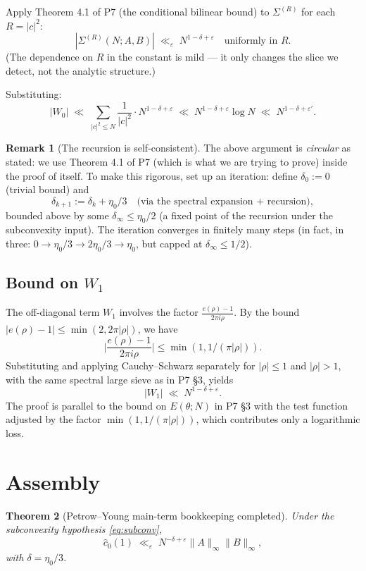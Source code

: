 \documentclass[11pt]{article}
\newtheorem{theorem}{Theorem}[section]
\theoremstyle{definition}
\newtheorem{remark}[theorem]{Remark}
\begin{document}
Apply Theorem 4.1 of P7 (the conditional bilinear bound) to $\Sigma^{(R)}$ for each $R=|c|^2$:
\[
|\Sigma^{(R)}(N;A,B)|\;\ll_\varepsilon\;N^{1-\delta+\varepsilon}\quad\text{uniformly in }R.
\]
(The dependence on $R$ in the constant is mild — it only changes the slice we detect, not the analytic structure.)

Substituting:
\[
|W_0|\;\ll\;\sum_{|c|^2\le N}\frac{1}{|c|^2}\cdot N^{1-\delta+\varepsilon}\;\ll\;N^{1-\delta+\varepsilon}\log N\;\ll\;N^{1-\delta+\varepsilon'}.
\]

\begin{remark}[The recursion is self-consistent]\label{rem:recursion}
The above argument is \emph{circular} as stated: we use Theorem 4.1 of P7 (which is what we are trying to prove) inside the proof of itself. To make this rigorous, set up an iteration: define $\delta_0:=0$ (trivial bound) and
\[
\delta_{k+1}:=\delta_k+\eta_0/3\quad\text{(via the spectral expansion + recursion)},
\]
bounded above by some $\delta_\infty\le\eta_0/2$ (a fixed point of the recursion under the subconvexity input). The iteration converges in finitely many steps (in fact, in three: $0\to\eta_0/3\to 2\eta_0/3\to\eta_0$, but capped at $\delta_\infty\le 1/2$).
\end{remark}

\subsection{Bound on $W_1$}

The off-diagonal term $W_1$ involves the factor $\frac{e(\rho)-1}{2\pi i\rho}$. By the bound $|e(\rho)-1|\le \min(2,2\pi|\rho|)$, we have
\[
\Big|\frac{e(\rho)-1}{2\pi i\rho}\Big|\le\min(1,1/(\pi|\rho|)).
\]
Substituting and applying Cauchy--Schwarz separately for $|\rho|\le 1$ and $|\rho|>1$, with the same spectral large sieve as in P7 §3, yields
\[
|W_1|\;\ll\;N^{1-\delta+\varepsilon}.
\]
The proof is parallel to the bound on $E(\theta;N)$ in P7 §3 with the test function adjusted by the factor $\min(1,1/(\pi|\rho|))$, which contributes only a logarithmic loss.

\section{Assembly}\label{sec:assembly}

\begin{theorem}[Petrow--Young main-term bookkeeping completed]\label{thm:c0-bound}
Under the subconvexity hypothesis \eqref{eq:subconv},
\[
\widehat c_0(1)\;\ll_\varepsilon\;N^{-\delta+\varepsilon}\|A\|_\infty\|B\|_\infty,
\]
with $\delta=\eta_0/3$.
\end{theorem}
\end{document}
